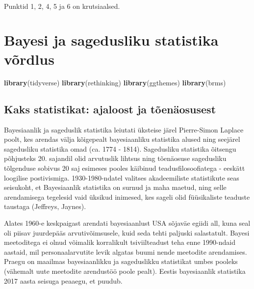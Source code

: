 \documentclass[]{book}
\newenvironment{Shaded}{\begin{snugshade}}{\end{snugshade}}
\newcommand{\KeywordTok}[1]{\textcolor[rgb]{0.13,0.29,0.53}{\textbf{#1}}}
\newcommand{\NormalTok}[1]{#1}
\begin{document}
Punktid 1, 2, 4, 5 ja 6 on krutsiaalsed.

\appendix


\chapter{Bayesi ja sagedusliku statistika
võrdlus}\label{bayesi-ja-sagedusliku-statistika-vordlus}

\begin{Shaded}
\begin{Highlighting}[]
\KeywordTok{library}\NormalTok{(tidyverse)}
\KeywordTok{library}\NormalTok{(rethinking)}
\KeywordTok{library}\NormalTok{(ggthemes)}
\KeywordTok{library}\NormalTok{(brms)}
\end{Highlighting}
\end{Shaded}

\section*{Kaks statistikat: ajaloost ja
tõenäosusest}\label{kaks-statistikat-ajaloost-ja-toenaosusest}

Bayesiaanlik ja sageduslik statistika leiutati üksteise järel
Pierre-Simon Laplace poolt, kes arendas välja kõigepealt bayesiaanliku
statistika alused ning seejärel sagedusliku statistika omad (ca. 1774 -
1814). Sagedusliku statistika õitsengu põhjusteks 20. sajandil olid
arvutuslik lihtsus ning tõenäosuse sagedusliku tõlgenduse sobivus 20 saj
esimeses pooles käibinud teadusfilosoofiatega - eeskätt loogilise
postivismiga. 1930-1980-ndatel valitses akadeemiliste statistikute seas
seisukoht, et Bayesiaanlik statistika on surnud ja maha maetud, ning
selle arendamisega tegelesid vaid üksikud inimesed, kes sageli olid
füüsikaliste teaduste taustaga (Jeffreys, Jaynes).

Alates 1960-e keskpaigast arendati bayesiaanlust USA sõjaväe egiidi all,
kuna seal oli piisav juurdepääs arvutivõimsusele, kuid seda tehti
paljuski salastatult. Bayesi meetoditega ei olnud võimalik korralikult
tsiviilteadust teha enne 1990-ndaid aastaid, mil personaalarvutite levik
algatas buumi nende meetodite arendamises. Praegu on maailmas
bayesiaanlikku ja sageduslikku statistikat umbes pooleks (vähemalt uute
meetodite arendustöö poole pealt). Eestis bayesiaanlik statistika 2017
aasta seisuga peaaegu, et puudub.
\end{document}
